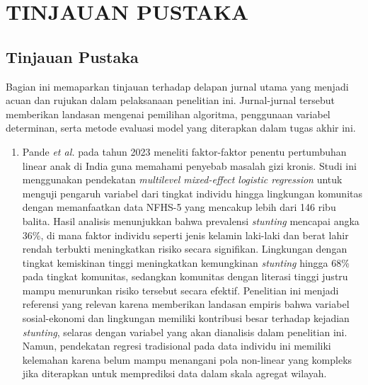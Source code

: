 \newpage
\chapter{TINJAUAN PUSTAKA} \label{Bab II}

\section{Tinjauan Pustaka} \label{II.Tinjauan}

Bagian ini memaparkan tinjauan terhadap delapan jurnal utama yang menjadi acuan dan rujukan dalam pelaksanaan penelitian ini. Jurnal-jurnal tersebut memberikan landasan mengenai pemilihan algoritma, penggunaan variabel determinan, serta metode evaluasi model yang diterapkan dalam tugas akhir ini.

\begin{enumerate}
    \item Pande \textit{et al.} \cite{pande_indian_stunting_2023} pada tahun 2023 meneliti faktor-faktor penentu pertumbuhan linear anak di India guna memahami penyebab masalah gizi kronis. Studi ini menggunakan pendekatan \textit{multilevel mixed-effect logistic regression} untuk menguji pengaruh variabel dari tingkat individu hingga lingkungan komunitas dengan memanfaatkan data NFHS-5 yang mencakup lebih dari 146 ribu balita. Hasil analisis menunjukkan bahwa prevalensi \textit{stunting} mencapai angka 36\%, di mana faktor individu seperti jenis kelamin laki-laki dan berat lahir rendah terbukti meningkatkan risiko secara signifikan. Lingkungan dengan tingkat kemiskinan tinggi meningkatkan kemungkinan \textit{stunting} hingga 68\% pada tingkat komunitas, sedangkan komunitas dengan literasi tinggi justru mampu menurunkan risiko tersebut secara efektif. Penelitian ini menjadi referensi yang relevan karena memberikan landasan empiris bahwa variabel sosial-ekonomi dan lingkungan memiliki kontribusi besar terhadap kejadian \textit{stunting}, selaras dengan variabel yang akan dianalisis dalam penelitian ini. Namun, pendekatan regresi tradisional pada data individu ini memiliki kelemahan karena belum mampu menangani pola non-linear yang kompleks jika diterapkan untuk memprediksi data dalam skala agregat wilayah.


\end{enumerate}
